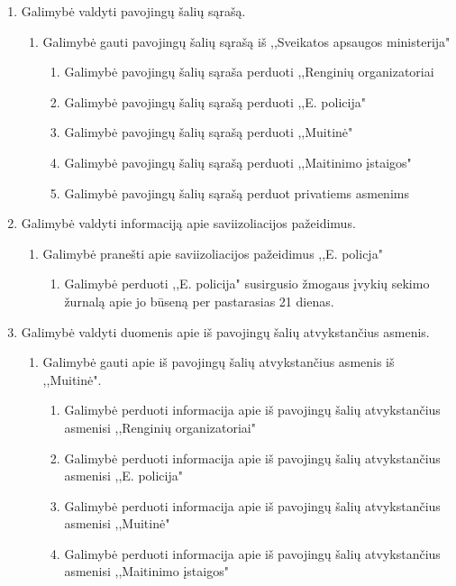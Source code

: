 \documentclass{VUMIFPSkursinis}
\begin{document}
\begin{enumerate}
\begin{enumerate}
			\end{enumerate}
		\item{Galimybė valdyti pavojingų šalių sąrašą.}
			\begin{enumerate}
				\item{Galimybė gauti pavojingų šalių sąrašą iš ,,Sveikatos apsaugos ministerija"}
					\begin{enumerate}
						\item{Galimybė pavojingų šalių sąraša perduoti ,,Renginių organizatoriai}
						\item{Galimybė pavojingų šalių sąrašą perduoti ,,E. policija"}
						\item{Galimybė pavojingų šalių sąrašą perduoti ,,Muitinė"}
						\item{Galimybė pavojingų šalių sąrašą perduoti ,,Maitinimo įstaigos"}
						\item{Galimybė pavojingų šalių sąrašą perduot privatiems asmenims}
					\end{enumerate}
			\end{enumerate}
		\item{Galimybė valdyti informaciją apie saviizoliacijos pažeidimus.}
			\begin{enumerate}
				\item{Galimybė pranešti apie saviizoliacijos pažeidimus ,,E. policja"}
					\begin{enumerate}
						\item{Galimybė perduoti ,,E. policija" susirgusio žmogaus įvykių sekimo žurnalą apie jo būseną per pastarasias 21 dienas.}
					\end{enumerate}
			\end{enumerate}
		\item{Galimybė valdyti duomenis apie iš pavojingų šalių atvykstančius asmenis.}
			\begin{enumerate}
				\item{Galimybė gauti apie iš pavojingų šalių atvykstančius asmenis iš ,,Muitinė".}
					\begin{enumerate}
						\item{Galimybė perduoti informacija apie iš pavojingų šalių atvykstančius asmenisi ,,Renginių organizatoriai"}
						\item{Galimybė perduoti informacija apie iš pavojingų šalių atvykstančius asmenisi ,,E. policija"}
						\item{Galimybė perduoti informacija apie iš pavojingų šalių atvykstančius asmenisi ,,Muitinė"}
						\item{Galimybė perduoti informacija apie iš pavojingų šalių atvykstančius asmenisi ,,Maitinimo įstaigos"}

\end{enumerate}
\end{enumerate}
\end{enumerate}
\end{document}
